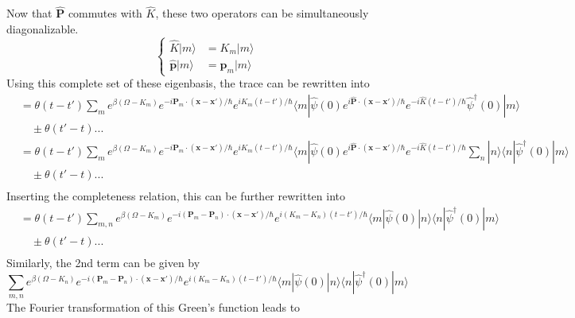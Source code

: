 Now that $\hat{\mathbf{P}}$ commutes with $\hat{K}$, these two operators can be simultaneously diagonalizable.
\[
\left\{
\begin{aligned}
\hat K |m\rangle &=K_m |m\rangle\\
\hat{\mathbf{p}} |m\rangle&=\mathbf{p}_m |m\rangle
\end{aligned}
\right.
\]
 Using this complete set of these eigenbasis, the trace can be rewritten into
\[
\begin{aligned}
&=\theta(t-t') \sum_m e^{\beta (\Omega-K_m)} e^{-i\mathbf{P}_m\cdot (\mathbf{x}-\mathbf{x}')/\hbar} e^{i K_m(t-t')/\hbar} \langle m| \hat{\psi}(0) e^{i\hat{\mathbf P}\cdot (\mathbf{x}-\mathbf{x}')/\hbar} e^{-i \hat K(t-t')/\hbar} \hat\psi ^\dag(0) |m\rangle\\
&\quad \pm \theta(t'-t)...\\
&=\theta(t-t') \sum_m e^{\beta (\Omega-K_m)} e^{-i\mathbf{P}_m\cdot (\mathbf{x}-\mathbf{x}')/\hbar} e^{i K_m(t-t')/\hbar} \langle m| \hat{\psi}(0) e^{i\hat{\mathbf P}\cdot (\mathbf{x}-\mathbf{x}')/\hbar} e^{-i \hat K(t-t')/\hbar} \sum_n |n\rangle \langle n| \hat\psi ^\dag(0) |m\rangle\\
&\quad \pm \theta(t'-t)...\\
\end{aligned}
\]
 Inserting the completeness relation, this can be further rewritten into
\begin{equation}
\begin{aligned}
&=\theta(t-t') \sum_{m,n} e^{\beta (\Omega-K_m)} e^{-i(\mathbf{P}_m-\mathbf{P}_n) \cdot (\mathbf{x}-\mathbf{x}')/\hbar} e^{i (K_m-K_n)(t-t')/\hbar}  \langle m| \hat{\psi}(0)  |n\rangle \langle n| \hat\psi ^\dag(0) |m\rangle\\
&\quad \pm \theta(t'-t)...\\
\end{aligned}
\end{equation}
 Similarly, the 2nd term can be given by
\[
\sum_{m,n} e^{\beta (\Omega-K_n)} e^{-i(\mathbf{P}_m-\mathbf{P}_n) \cdot (\mathbf{x}-\mathbf{x}')/\hbar} e^{i (K_m-K_n)(t-t')/\hbar}  \langle m| \hat{\psi}(0)  |n\rangle \langle n| \hat\psi ^\dag(0) |m\rangle
\]
The Fourier transformation of this Green's function leads to
